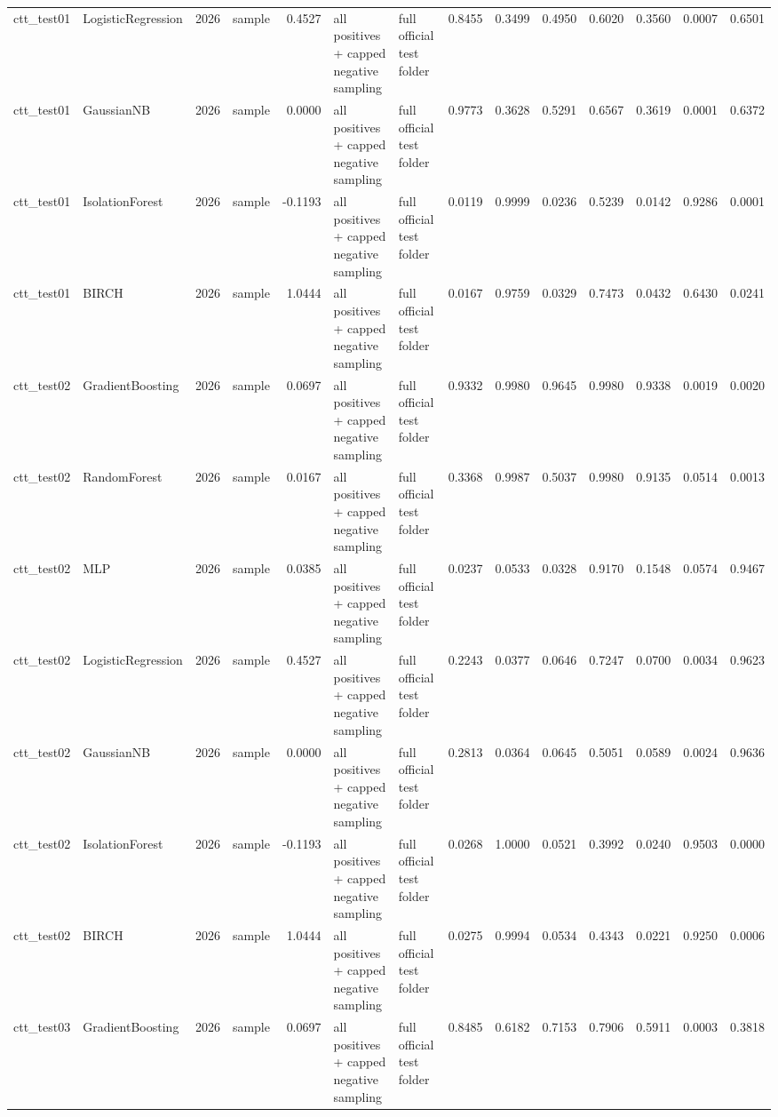 \begin{tabular}{llrlrllrrrrrrr}
ctt\_test01 & LogisticRegression & 2026 & sample & 0.4527 & all positives + capped negative sampling & full official test folder & 0.8455 & 0.3499 & 0.4950 & 0.6020 & 0.3560 & 0.0007 & 0.6501 \\
ctt\_test01 & GaussianNB & 2026 & sample & 0.0000 & all positives + capped negative sampling & full official test folder & 0.9773 & 0.3628 & 0.5291 & 0.6567 & 0.3619 & 0.0001 & 0.6372 \\
ctt\_test01 & IsolationForest & 2026 & sample & -0.1193 & all positives + capped negative sampling & full official test folder & 0.0119 & 0.9999 & 0.0236 & 0.5239 & 0.0142 & 0.9286 & 0.0001 \\
ctt\_test01 & BIRCH & 2026 & sample & 1.0444 & all positives + capped negative sampling & full official test folder & 0.0167 & 0.9759 & 0.0329 & 0.7473 & 0.0432 & 0.6430 & 0.0241 \\
ctt\_test02 & GradientBoosting & 2026 & sample & 0.0697 & all positives + capped negative sampling & full official test folder & 0.9332 & 0.9980 & 0.9645 & 0.9980 & 0.9338 & 0.0019 & 0.0020 \\
ctt\_test02 & RandomForest & 2026 & sample & 0.0167 & all positives + capped negative sampling & full official test folder & 0.3368 & 0.9987 & 0.5037 & 0.9980 & 0.9135 & 0.0514 & 0.0013 \\
ctt\_test02 & MLP & 2026 & sample & 0.0385 & all positives + capped negative sampling & full official test folder & 0.0237 & 0.0533 & 0.0328 & 0.9170 & 0.1548 & 0.0574 & 0.9467 \\
ctt\_test02 & LogisticRegression & 2026 & sample & 0.4527 & all positives + capped negative sampling & full official test folder & 0.2243 & 0.0377 & 0.0646 & 0.7247 & 0.0700 & 0.0034 & 0.9623 \\
ctt\_test02 & GaussianNB & 2026 & sample & 0.0000 & all positives + capped negative sampling & full official test folder & 0.2813 & 0.0364 & 0.0645 & 0.5051 & 0.0589 & 0.0024 & 0.9636 \\
ctt\_test02 & IsolationForest & 2026 & sample & -0.1193 & all positives + capped negative sampling & full official test folder & 0.0268 & 1.0000 & 0.0521 & 0.3992 & 0.0240 & 0.9503 & 0.0000 \\
ctt\_test02 & BIRCH & 2026 & sample & 1.0444 & all positives + capped negative sampling & full official test folder & 0.0275 & 0.9994 & 0.0534 & 0.4343 & 0.0221 & 0.9250 & 0.0006 \\
ctt\_test03 & GradientBoosting & 2026 & sample & 0.0697 & all positives + capped negative sampling & full official test folder & 0.8485 & 0.6182 & 0.7153 & 0.7906 & 0.5911 & 0.0003 & 0.3818 \\

\end{tabular}
